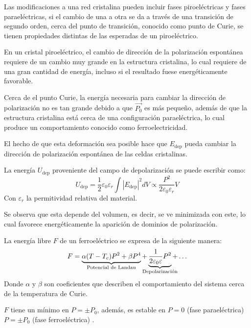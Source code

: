 \documentclass[../main.tex]{subfiles}
\begin{document}
Las modificaciones a una red cristalina pueden incluir fases piroeléctricas y fases paraeléctricas, si el cambio de una a otra se da a través de una transición de segundo orden, cerca del punto de transición, conocido como punto de Curie, se tienen propiedades distintas de las esperadas de un piroeléctrico.

En un cristal piroeléctrico, el cambio de dirección de la polarización espontánea requiere de un cambio muy grande en la estructura cristalina, lo cual requiere de una gran cantidad de energía, incluso si el resultado fuese energéticamente favorable.

Cerca de el punto Curie, la energía necesaria para cambiar la dirección de polarización no es tan grande debido a que $\vec{P_{0}}$ es más pequeño, además de que la estructura cristalina está cerca de una configuración paraeléctrica, lo cual produce un comportamiento conocido como ferroelectricidad.

El hecho de que esta deformación sea posible hace que $E_\text{dep}$ pueda cambiar la dirección de polarización espontánea de las celdas cristalinas.

La energía $U_\text{dep}$ proveniente del campo de depolarización se puede escribir como:
\begin{equation}
    U_\text{dep}=\dfrac{1}{2}\varepsilon_0\varepsilon_r\int|E_\text{dep}|^2dV\propto\dfrac{P^2}{2\varepsilon_0\varepsilon_r}V
    \label{eq:energiadepolarizacion}
\end{equation}
Con $\varepsilon_r$ la permitividad relativa del material.

Se observa que esta depende del volumen, es decir, se ve minimizada con este, lo cual favorece energéticamente la aparición de dominios de polarización.

La energía libre $F$ de un ferroeléctrico se expresa de la siguiente manera:
\begin{equation}
    F=\underbrace{\alpha(T-T_c)P^2+\beta P^4}_\text{\clap{Potencial de Landau}}+\underbrace{\dfrac{1}{2\varepsilon_0\varepsilon}P^2}_\text{\clap{Depolarización}}+\dots
    \label{eq:energíalibre}
\end{equation}
Donde $\alpha$ y $\beta$ son coeficientes que describen el comportamiento del sistema cerca de la temperatura de Curie.

$F$ tiene un mínimo en $P=\pm P_{0}$, además, es estable en $P=0$ (fase paraeléctrica) $P=\pm P_{0}$ (fase ferroeléctrica) \cite{Landau1984}.
\end{document}
